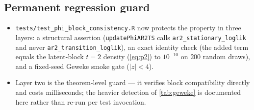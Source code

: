 \documentclass[11pt]{article}
\newcommand{\eref}[1]{(\ref{#1})}
\theoremstyle{plain}
\theoremstyle{definition}
\theoremstyle{remark}
\begin{document}
\subsection{Permanent regression guard}\label{sec:guard}

\begin{itemize}
  \item \texttt{tests/test\_phi\_block\_consistency.R} now protects the
        property in three layers: a structural assertion
        (\texttt{updatePhiAR2TS} calls \texttt{ar2\_stationary\_loglik} and
        never \texttt{ar2\_transition\_loglik}), an exact identity check
        (the added term equals the latent-block $t = 2$ density
        \eref{eq:p2} to $10^{-10}$ on $200$ random draws), and a fixed-seed
        Geweke smoke gate ($|z| < 4$).
  \item Layer two is the theorem-level guard --- it verifies block
        compatibility directly and costs milliseconds; the heavier
        detection of \cref{tab:geweke} is documented here rather than
        re-run per test invocation.
\end{itemize}
\end{document}
